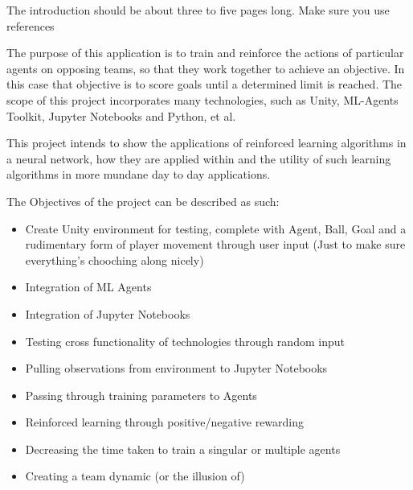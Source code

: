 The introduction should be about three to five pages long.
Make sure you use references~\cite{einstein}

The purpose of this application is to train and reinforce the actions of particular agents on opposing teams, so that they work together to achieve an objective. In this case that objective is to score goals until a determined limit is reached. The scope of this project incorporates many technologies, such as Unity, ML-Agents Toolkit, Jupyter Notebooks and Python, et al. 

This project intends to show the applications of reinforced learning algorithms in a neural network, how they are applied within and the utility of such learning algorithms in more mundane day to day applications.



The Objectives of the project can be described as such:

\begin{itemize}
  \item Create Unity environment for testing, complete with Agent, Ball, Goal and a rudimentary form of player movement through user input (Just to make sure 
everything's chooching along nicely)
  \item Integration of ML Agents 
  \item Integration of Jupyter Notebooks
  \item Testing cross functionality of technologies through random input
  \item Pulling observations from environment to Jupyter Notebooks
  \item Passing through training parameters to Agents
  \item Reinforced learning through positive/negative rewarding
  \item Decreasing the time taken to train a singular or multiple agents
  \item Creating a team dynamic (or the illusion of)
\end{itemize}